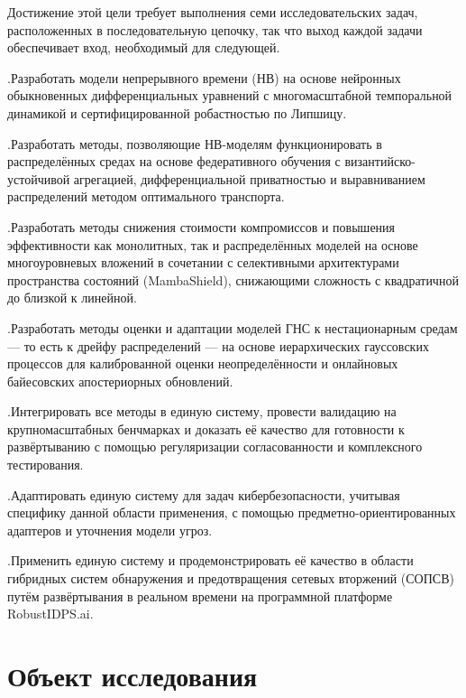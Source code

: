 Достижение этой цели требует выполнения семи исследовательских задач, расположенных в последовательную цепочку, так что выход каждой задачи обеспечивает вход, необходимый для следующей.

.\quad Разработать модели непрерывного времени (НВ) на основе нейронных обыкновенных дифференциальных уравнений с многомасштабной темпоральной динамикой и сертифицированной робастностью по Липшицу.

.\quad Разработать методы, позволяющие НВ-моделям функционировать в распределённых средах на основе федеративного обучения с византийско-устойчивой агрегацией, дифференциальной приватностью и выравниванием распределений методом оптимального транспорта.

.\quad Разработать методы снижения стоимости компромиссов и повышения эффективности как монолитных, так и распределённых моделей на основе многоуровневых вложений в сочетании с селективными архитектурами пространства состояний (MambaShield), снижающими сложность с квадратичной до близкой к линейной.

.\quad Разработать методы оценки и адаптации моделей ГНС к нестационарным средам --- то есть к дрейфу распределений --- на основе иерархических гауссовских процессов для калиброванной оценки неопределённости и онлайновых байесовских апостериорных обновлений.

.\quad Интегрировать все методы в единую систему, провести валидацию на крупномасштабных бенчмарках и доказать её качество для готовности к развёртыванию с помощью регуляризации согласованности и комплексного тестирования.

.\quad Адаптировать единую систему для задач кибербезопасности, учитывая специфику данной области применения, с помощью предметно-ориентированных адаптеров и уточнения модели угроз.

.\quad Применить единую систему и продемонстрировать её качество в области гибридных систем обнаружения и предотвращения сетевых вторжений (СОПСВ) путём развёртывания в реальном времени на программной платформе RobustIDPS.ai.


\section*{Объект исследования}

